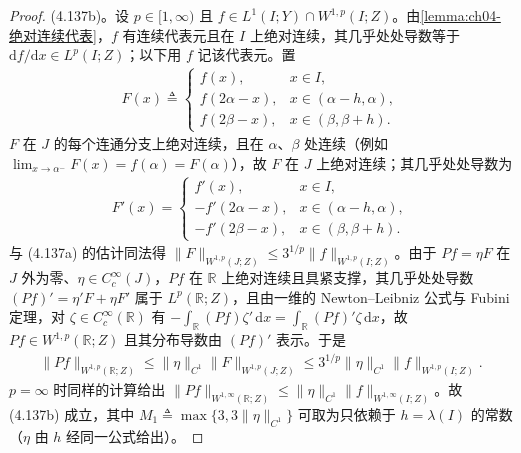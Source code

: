 \documentclass[../../main.tex]{subfiles}%
\begin{document}
\begin{proof}
(4.137b)。设 $p\in[1,\infty)$ 且 $f\in L^1(I;Y)\cap W^{1,p}(I;Z)$。由\cref{lemma:ch04-绝对连续代表}，$f$ 有连续代表元且在 $I$ 上绝对连续，其几乎处处导数等于 $\mathrm{d}f/\mathrm{d}x\in L^p(I;Z)$；以下用 $f$ 记该代表元。置
\begin{align*}
F(x)\triangleq
\begin{cases}
f(x), & x\in I,\\
f(2\alpha-x), & x\in(\alpha-h,\alpha),\\
f(2\beta-x), & x\in(\beta,\beta+h).
\end{cases}
\end{align*}
$F$ 在 $J$ 的每个连通分支上绝对连续，且在 $\alpha$、$\beta$ 处连续（例如 $\lim_{x\to\alpha^-}F(x)=f(\alpha)=F(\alpha)$），故 $F$ 在 $J$ 上绝对连续；其几乎处处导数为
\begin{align*}
F'(x)=
\begin{cases}
f'(x), & x\in I,\\
-f'(2\alpha-x), & x\in(\alpha-h,\alpha),\\
-f'(2\beta-x), & x\in(\beta,\beta+h).
\end{cases}
\end{align*}
与 (4.137a) 的估计同法得 $\|F\|_{W^{1,p}(J;Z)}\leqslant3^{1/p}\|f\|_{W^{1,p}(I;Z)}$。由于 $Pf=\eta F$ 在 $J$ 外为零、$\eta\in C_c^\infty(J)$，$Pf$ 在 $\mathbb{R}$ 上绝对连续且具紧支撑，其几乎处处导数 $(Pf)'=\eta'F+\eta F'$ 属于 $L^p(\mathbb{R};Z)$，且由一维的 Newton--Leibniz 公式与 Fubini 定理，对 $\zeta\in C_c^\infty(\mathbb{R})$ 有 $-\int_{\mathbb{R}}(Pf)\zeta'\,\mathrm{d}x=\int_{\mathbb{R}}(Pf)'\zeta\,\mathrm{d}x$，故 $Pf\in W^{1,p}(\mathbb{R};Z)$ 且其分布导数由 $(Pf)'$ 表示。于是
\begin{align*}
\|Pf\|_{W^{1,p}(\mathbb{R};Z)}\leqslant\|\eta\|_{C^1}\|F\|_{W^{1,p}(J;Z)}\leqslant3^{1/p}\|\eta\|_{C^1}\|f\|_{W^{1,p}(I;Z)} .
\end{align*}
$p=\infty$ 时同样的计算给出 $\|Pf\|_{W^{1,\infty}(\mathbb{R};Z)}\leqslant\|\eta\|_{C^1}\|f\|_{W^{1,\infty}(I;Z)}$。故 (4.137b) 成立，其中 $M_1\triangleq\max\{3,3\|\eta\|_{C^1}\}$ 可取为只依赖于 $h=\lambda(I)$ 的常数（$\eta$ 由 $h$ 经同一公式给出）。
\end{proof}
\end{document}
